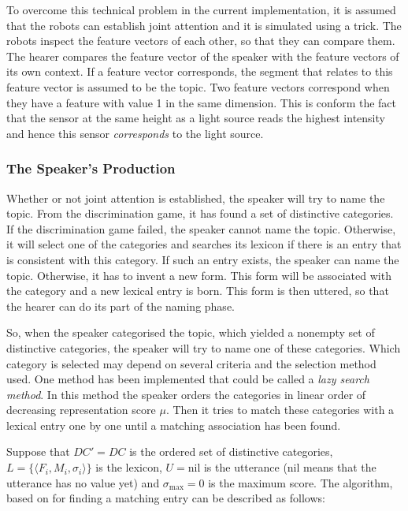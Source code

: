 To overcome this technical problem in the current implementation, it is assumed that the robots can establish joint attention and it is simulated using a trick. The robots inspect the feature vectors of each other, so that they can compare them. The hearer compares the feature vector of the speaker with the feature vectors of its own context. If a feature vector corresponds, the segment that relates to this feature vector is assumed to be the topic. Two feature vectors correspond when they have a feature with value 1 in the same dimension. This is conform the fact that the sensor at the same height as a light source reads the highest intensity and hence this sensor {\em corresponds} to the light source.


\subsubsection{The Speaker's Production}\label{s:cm:production}

Whether or not joint attention is established, the speaker will try to name the topic. From the discrimination game, it has found a set of distinctive categories. If the discrimination game failed, the speaker cannot name the topic. Otherwise, it will select one of the categories and searches its lexicon if there is an entry that is consistent with this category. If such an entry exists, the speaker can name the topic. Otherwise, it has to invent a new form. This form will be associated with the category and a new lexical entry is born. This form is then uttered, so that the hearer can do its part of the naming phase. 

So, when the speaker categorised the topic, which yielded a nonempty set of distinctive categories, the speaker will try to name one of these categories. Which category is selected may depend on several criteria and the selection method used. One method has been implemented that could be called a {\em lazy search method}. In this method the speaker orders the categories in linear order of decreasing representation score $\mu$. Then it tries to match these categories with a lexical entry one by one until a matching association has been found.

Suppose that $DC'=DC$ is the ordered set of distinctive categories, $L=\{\langle F_i,M_i,\sigma_i \rangle \}$ is the lexicon, $U=\mbox{nil}$ is the utterance (nil means that the utterance has no value yet) and $\sigma_{\mbox{max}}=0$ is the maximum score. The algorithm, based on \citep{steels:1996a} for finding a matching entry can be described as follows:

